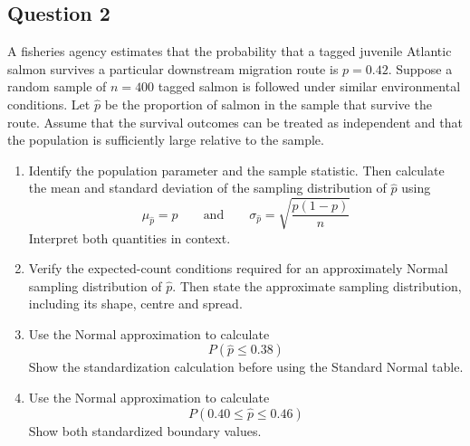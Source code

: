 \documentclass[10pt,letterpaper]{article}
\begin{document}
\subsection*{Question 2}
A fisheries agency estimates that the probability that a tagged juvenile Atlantic salmon survives a particular downstream migration route is $p=0.42$. Suppose a random sample of $n=400$ tagged salmon is followed under similar environmental conditions. Let $\hat{p}$ be the proportion of salmon in the sample that survive the route. Assume that the survival outcomes can be treated as independent and that the population is sufficiently large relative to the sample.
\begin{enumerate}
	\item Identify the population parameter and the sample statistic. Then calculate the mean and standard deviation of the sampling distribution of $\hat{p}$ using
$$\mu_{\hat{p}}=p \qquad\text{and}\qquad \sigma_{\hat{p}}=\sqrt{\frac{p(1-p)}{n}}$$
Interpret both quantities in context.
	\item Verify the expected-count conditions required for an approximately Normal sampling distribution of $\hat{p}$. Then state the approximate sampling distribution, including its shape, centre and spread.
	\item Use the Normal approximation to calculate
$$P(\hat{p}\leq0.38)$$
Show the standardization calculation before using the Standard Normal table.
	\item Use the Normal approximation to calculate
$$P(0.40\leq\hat{p}\leq0.46)$$
Show both standardized boundary values.
\end{enumerate}

\newpage

\end{document}

